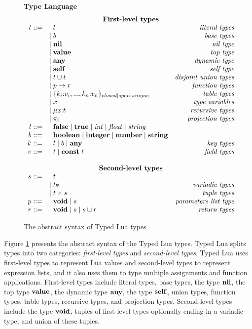 \begin{figure}[!ht]
\textbf{Type Language}\\
\dstart
$$
\begin{array}{rlr}
\multicolumn{3}{c}{\textbf{First-level types}}\\
t ::= & \;\; l & \textit{literal types}\\
& | \; b & \textit{base types}\\
& | \; \Nil & \textit{nil type}\\
& | \; \Value & \textit{top type}\\
& | \; \Any & \textit{dynamic type}\\
& | \; \Self & \textit{self type}\\
& | \; t \cup t & \textit{disjoint union types}\\
& | \; p \rightarrow r & \textit{function types}\\
& | \; \{k_{i}{:}v_{i}, ..., k_{n}{:}v_{n}\}_{closed|open|unique} & \textit{table types}\\
& | \; x & \textit{type variables}\\
& | \; \mu x.t & \textit{recursive types}\\
& | \; \pi_{i} & \textit{projection types}\\
l ::= & \;\; \False \; | \; \True \; | \; {\it int} \; | \; {\it float} \; | \; {\it string} & \\
b ::= & \;\; \Boolean \; | \; \Integer \; | \; \Number \; | \; \String & \\
k ::= & \;\; l \; | \; b \; | \; \Any & \textit{key types}\\
v ::= & \;\; t \; | \; \Const \; t & \textit{field types}\\ 
\multicolumn{3}{c}{}\\
\multicolumn{3}{c}{\textbf{Second-level types}}\\
s ::= & \;\; t &\\
& | \; t* & \textit{variadic types}\\
& | \; t \times s & \textit{tuple types}\\
p ::= & \;\; \Void \; | \; s & \textit{parameters list type}\\
r ::= & \;\; \Void \; | \; s \; | \; s \sqcup r & \textit{return types}\\
\end{array}
$$
\dend
\caption{The abstract syntax of Typed Lua types}
\label{fig:typelang}
\end{figure}

Figure \ref{fig:typelang} presents the abstract syntax of the
Typed Lua types.
Typed Lua splits types into two categories:
\emph{first-level types} and \emph{second-level types}.
Typed Lua uses first-level types to represent Lua values and
second-level types to represent expression lists, and it also
uses them to type multiple assignments and function applications.
First-level types include literal types, base types, the type $\mathbf{nil}$,
the top type $\mathbf{value}$, the dynamic type $\mathbf{any}$, the type $\mathbf{self}$,
union types, function types, table types, recursive types, and
projection types.
Second-level types include the type $\mathbf{void}$, tuples of first-level
types optionally ending in a variadic type, and union of these tuples.

